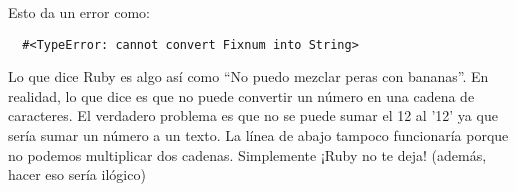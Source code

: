 Esto da un error como:
\begin{lstlisting}
  #<TypeError: cannot convert Fixnum into String>
\end{lstlisting}

Lo que dice Ruby es algo así como “No puedo mezclar peras con bananas”. En realidad, lo que dice es que no puede convertir un número en una cadena de caracteres. El verdadero problema es que no se puede sumar el 12 al '12' ya que sería sumar un número a un texto. La línea de abajo tampoco funcionaría porque no podemos multiplicar dos cadenas. Simplemente ¡Ruby no te deja! (además, hacer eso sería ilógico)